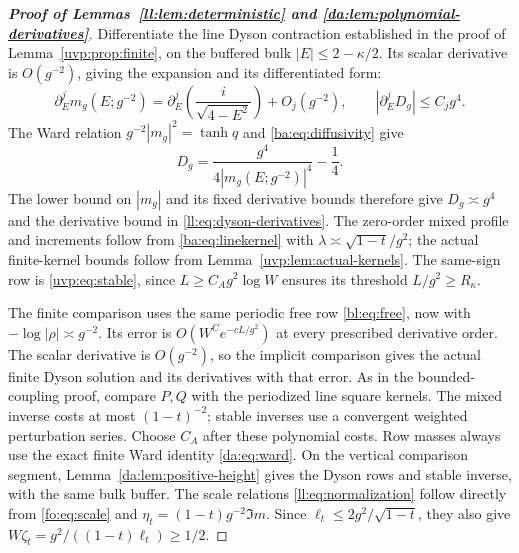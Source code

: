 \documentclass[11pt]{article}
\numberwithin{equation}{section}
\theoremstyle{remark}
\begin{document}
\begin{proof}[\textbf{Proof of Lemmas~\ref{ll:lem:deterministic} and \ref{da:lem:polynomial-derivatives}}]
Differentiate the line Dyson contraction established in the proof of
Lemma~\ref{uvp:prop:finite}, on the buffered bulk
$|E|\le2-\kappa/2$. Its scalar derivative is $O(g^{-2})$, giving
the expansion and its differentiated form:
\begin{equation}\label{ll:eq:dyson-derivatives}
 \partial_E^j m_g(E;g^{-2})
 =\partial_E^j\!\left(\frac{i}{\sqrt{4-E^2}}\right)+O_j(g^{-2}),
 \qquad |\partial_E^j D_g|\le C_jg^4.
\end{equation}
The Ward relation $g^{-2}|m_g|^2=\tanh q$ and
\eqref{ba:eq:diffusivity} give
\[
 D_g=\frac{g^4}{4|m_g(E;g^{-2})|^4}-\frac14.
\]
The lower bound on $|m_g|$ and its fixed derivative bounds therefore
give $D_g\asymp g^4$ and the derivative bound in
\eqref{ll:eq:dyson-derivatives}. The zero-order mixed profile and increments
follow from \eqref{ba:eq:linekernel} with
$\lambda\asymp\sqrt{1-t}/g^2$; the actual finite-kernel bounds follow
from Lemma~\ref{uvp:lem:actual-kernels}. The same-sign row is
\eqref{uvp:eq:stable}, since $L\ge C_Ag^2\log W$ ensures its threshold
$L/g^2\ge R_\kappa$.

The finite comparison uses the same periodic free row
\eqref{bl:eq:free}, now with $-\log|\rho|\asymp g^{-2}$.
Its error is $O(W^Ce^{-cL/g^2})$ at every prescribed derivative order.
The scalar derivative is $O(g^{-2})$, so the implicit comparison
gives the actual finite Dyson solution and its derivatives with that error.
As in the bounded-coupling proof, compare $P,Q$ with the
periodized line square kernels. The mixed inverse costs at most
$(1-t)^{-2}$; stable inverses use a convergent weighted perturbation
series. Choose $C_A$ after these polynomial costs. Row masses always
use the exact finite Ward identity \eqref{da:eq:ward}.
On the vertical comparison segment, Lemma~\ref{da:lem:positive-height}
gives the Dyson rows and stable inverse, with the same bulk buffer.
The scale relations \eqref{ll:eq:normalization} follow directly from
\eqref{fo:eq:scale} and $\eta_t=(1-t)g^{-2}\Im m$.
Since $\ell_t\le2g^2/\sqrt{1-t}$, they also give
$W\zeta_t=g^2/((1-t)\ell_t)\ge1/2$.


\end{proof}
\end{document}
